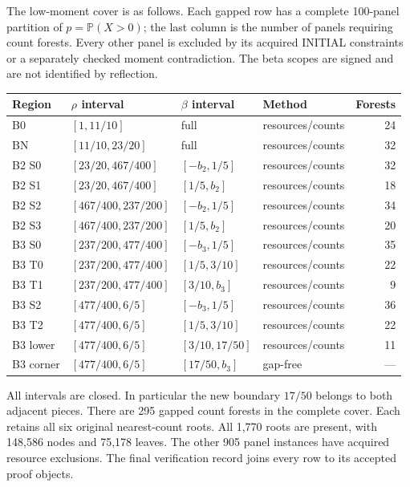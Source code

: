 \documentclass[11pt,a4paper]{article}
\theoremstyle{definition}
\newcommand{\Pp}{\mathbb P}
\begin{document}
The low-moment cover is as follows. Each gapped row has a complete
100-panel partition of $p=\Pp(X>0)$; the last column is the number of
panels requiring count forests. Every other panel is excluded by its
acquired INITIAL constraints or a separately checked moment contradiction.
The beta scopes are signed and are not identified by reflection.

\begin{center}\small
\begin{tabular}{@{}llllr@{}}\toprule
Region & $\rho$ interval & $\beta$ interval & Method & Forests\\\midrule
B0 & $[1,11/10]$ & full & resources/counts &24\\
BN & $[11/10,23/20]$ & full & resources/counts &32\\
B2 S0 & $[23/20,467/400]$ & $[-b_2,1/5]$ & resources/counts &32\\
B2 S1 & $[23/20,467/400]$ & $[1/5,b_2]$ & resources/counts &18\\
B2 S2 & $[467/400,237/200]$ & $[-b_2,1/5]$ & resources/counts &34\\
B2 S3 & $[467/400,237/200]$ & $[1/5,b_2]$ & resources/counts &20\\
B3 S0 & $[237/200,477/400]$ & $[-b_3,1/5]$ & resources/counts &35\\
B3 T0 & $[237/200,477/400]$ & $[1/5,3/10]$ & resources/counts &22\\
B3 T1 & $[237/200,477/400]$ & $[3/10,b_3]$ & resources/counts &9\\
B3 S2 & $[477/400,6/5]$ & $[-b_3,1/5]$ & resources/counts &36\\
B3 T2 & $[477/400,6/5]$ & $[1/5,3/10]$ & resources/counts &22\\
B3 lower & $[477/400,6/5]$ & $[3/10,17/50]$ & resources/counts &11\\
B3 corner & $[477/400,6/5]$ & $[17/50,b_3]$ & gap-free &---\\\bottomrule
\end{tabular}
\end{center}
All intervals are closed. In particular the new boundary $17/50$ belongs
to both adjacent pieces. There are 295 gapped count forests in the
complete cover. Each retains all six original nearest-count roots.
All 1,770 roots are present, with 148,586 nodes and 75,178 leaves.
The other 905 panel instances have acquired resource exclusions.
The final verification record joins every row to its accepted proof objects.
\end{document}
